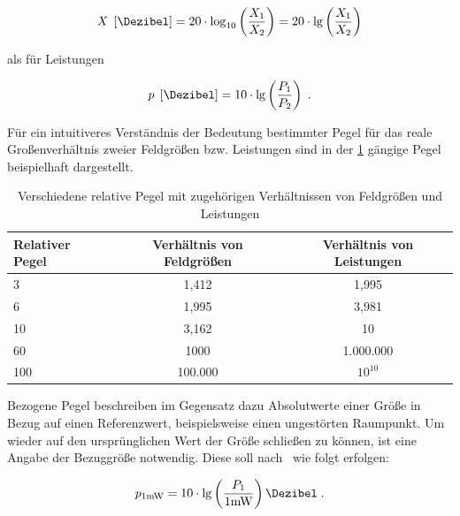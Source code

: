 \begin{equation}
    X \; \left[\si{\Dezibel}\right] = 20 \cdot \log_{10} \left( \frac{X_1}{X_2} \right) = 20 \cdot \lg \left( \frac{X_1}{X_2} \right)
\end{equation}

als für Leistungen

\begin{equation}
    p \; \left[\si{\Dezibel}\right] = 10 \cdot \lg \left( \frac{P_1}{P_2} \right) \; .
\end{equation}

Für ein intuitiveres Verständnis der Bedeutung bestimmter Pegel für das reale Großenverhältnis zweier Feldgrößen bzw. Leistungen sind in der \Tabelle\ref{tab:2_Relative_Pegel} gängige Pegel beispielhaft dargestellt.
\par
\vspace{\linespace}

\begin{table}[H]
\renewcommand{\arraystretch}{\tablestretch}
\centering
\caption{Verschiedene relative Pegel mit zugehörigen Verhältnissen von Feldgrößen und Leistungen}
\vspace{\tablespace}
\begin{tabular}{l c c}
    \toprule
    \textbf{Relativer Pegel} \boldmath{$\left[\si{\Dezibel}\right]$} & \textbf{Verhältnis von Feldgrößen} & \textbf{Verhältnis von Leistungen} \\
    \midrule
    3   &   1,412   &   1,995   \\
    6   &   1,995   &   3,981   \\
    10  &   3,162   &   10      \\
    60  &   1000    &   1.000.000 \\
    100 &   100.000  &   $10^{10}$ \\
    \bottomrule
\end{tabular}
\label{tab:2_Relative_Pegel}
\end{table}

Bezogene Pegel beschreiben im Gegensatz dazu Absolutwerte einer Größe in Bezug auf einen Referenzwert, beispielsweise einen ungestörten Raumpunkt. Um wieder auf den ursprünglichen Wert der Größe schließen zu können, ist eine Angabe der Bezuggröße notwendig. Diese soll nach~\cite{IEC60027-3} wie folgt erfolgen: 

\begin{equation}
    p_{1 \si{\milli\watt}} = 10 \cdot \lg \left( \frac{P_1}{1 \si{\milli\watt}}\right) \si{\Dezibel} \; .
\end{equation}

